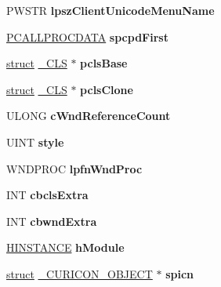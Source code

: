 \begin{DoxyCompactItemize}
P\+W\+S\+TR {\bfseries lpsz\+Client\+Unicode\+Menu\+Name}
\item 
\mbox{\label{struct___c_l_s_aaa63c0c19f03526eea384412cff878b3}} 
\hyperlink{struct___c_a_l_l_p_r_o_c_d_a_t_a}{P\+C\+A\+L\+L\+P\+R\+O\+C\+D\+A\+TA} {\bfseries spcpd\+First}
\item 
\mbox{\label{struct___c_l_s_a42b6ecd1a171fb2f84da2ddb25d1d448}} 
\hyperlink{interfacestruct}{struct} \hyperlink{struct___c_l_s}{\+\_\+\+C\+LS} $\ast$ {\bfseries pcls\+Base}
\item 
\mbox{\label{struct___c_l_s_ace4db19e46700b3df63692b0747b21d2}} 
\hyperlink{interfacestruct}{struct} \hyperlink{struct___c_l_s}{\+\_\+\+C\+LS} $\ast$ {\bfseries pcls\+Clone}
\item 
\mbox{\label{struct___c_l_s_a429857609d67c31032ec55305a5a0bd8}} 
U\+L\+O\+NG {\bfseries c\+Wnd\+Reference\+Count}
\item 
\mbox{\label{struct___c_l_s_ade964be6461643959eed2f9a620af094}} 
U\+I\+NT {\bfseries style}
\item 
\mbox{\label{struct___c_l_s_a5e32923a868bca7dbb4188285d41d51e}} 
W\+N\+D\+P\+R\+OC {\bfseries lpfn\+Wnd\+Proc}
\item 
\mbox{\label{struct___c_l_s_a48e83229c25e81cfc94ebe981d53dae1}} 
I\+NT {\bfseries cbcls\+Extra}
\item 
\mbox{\label{struct___c_l_s_a9df62517679b9fec1bfebf71f5d8e7ce}} 
I\+NT {\bfseries cbwnd\+Extra}
\item 
\mbox{\label{struct___c_l_s_adfcebc1f7af9f3eebae07d7d6e37754e}} 
\hyperlink{interfacevoid}{H\+I\+N\+S\+T\+A\+N\+CE} {\bfseries h\+Module}
\item 
\mbox{\label{struct___c_l_s_a6de47a703b3c423f6fc69866f4cc81ce}} 
\hyperlink{interfacestruct}{struct} \hyperlink{struct___c_u_r_i_c_o_n___o_b_j_e_c_t}{\+\_\+\+C\+U\+R\+I\+C\+O\+N\+\_\+\+O\+B\+J\+E\+CT} $\ast$ {\bfseries spicn}
\item 
\mbox{\label{struct___c_l_s_a0100492916cef35c7486d0fd484f51e5}} 

\end{DoxyCompactItemize}
